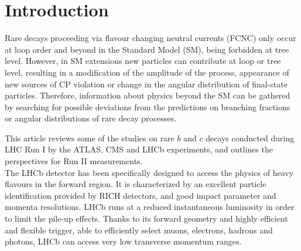 %
%
%
\section{Introduction}

Rare decays proceeding via flavour changing neutral currents (FCNC) only occur at loop order and beyond in the Standard Model (SM), being forbidden at tree level.
However, in SM extensions new particles can contribute at loop or tree level, resulting in a modification of the amplitude of the process, appearance of new sources of CP violation or change in the angular distribution of final-state particles.
Therefore, information about physics beyond the SM can be gathered by searching for possible deviations from the predictions on branching fractions or angular distributions of rare decay processes.

This article reviews some of the studies on rare $b$ and $c$ decays conducted during LHC Run I by the ATLAS\cite{ATLAS}, CMS\cite{CMS} and LHCb\cite{LHCb} experiments, and outlines the perspectives for Run II measurements.\\

The LHCb detector has been specifically designed to access the physics of heavy flavours in the forward region.
It is characterized by an excellent particle identification provided by RICH detectors, and good impact parameter and momenta resolutions.
LHCb runs at a reduced instantaneous luminosity in order to limit the pile-up effects.
Thanks to its forward geometry and highly efficient and flexible trigger, able to efficiently select muons, electrons, hadrons and photons, LHCb can access very low transverse momentum ranges.

